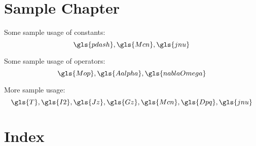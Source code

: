 \documentclass{report}
\begin{document}
\chapter{Sample Chapter}

Some sample usage of constants:
\[
 \gls{pdash}, \gls{Mcn}, \gls{jnu}
\]

Some sample usage of operators:
\[
  \gls{Mop}, \gls{Aalpha}, \gls{nablaOmega}
\]

\newpage

More sample usage:
\[
\gls{T}, \gls{I2}, \gls{Jz}, \gls{Gz},
\gls{Mcn}, \gls{Dpq}, \gls{jnu}
\]

\chapter*{Index}

\printglossaries
\end{document}
